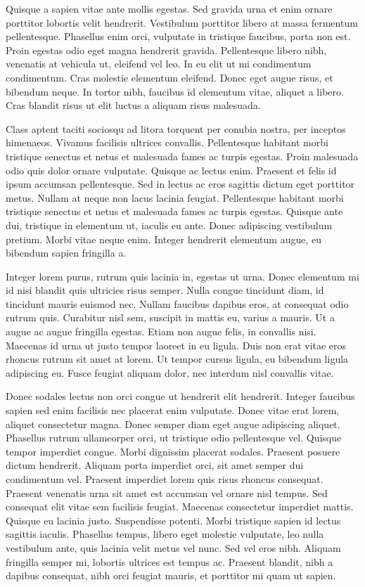 \documentclass{EPUProjetDi}
\begin{document}
Quisque a sapien vitae ante mollis egestas. Sed gravida urna et enim ornare porttitor lobortis velit hendrerit. Vestibulum porttitor libero at massa fermentum pellentesque. Phasellus enim orci, vulputate in tristique faucibus, porta non est. Proin egestas odio eget magna hendrerit gravida. Pellentesque libero nibh, venenatis at vehicula ut, eleifend vel leo. In eu elit ut mi condimentum condimentum. Cras molestie elementum eleifend. Donec eget augue risus, et bibendum neque. In tortor nibh, faucibus id elementum vitae, aliquet a libero. Cras blandit risus ut elit luctus a aliquam risus malesuada.

Class aptent taciti sociosqu ad litora torquent per conubia nostra, per inceptos himenaeos. Vivamus facilisis ultrices convallis. Pellentesque habitant morbi tristique senectus et netus et malesuada fames ac turpis egestas. Proin malesuada odio quis dolor ornare vulputate. Quisque ac lectus enim. Praesent et felis id ipsum accumsan pellentesque. Sed in lectus ac eros sagittis dictum eget porttitor metus. Nullam at neque non lacus lacinia feugiat. Pellentesque habitant morbi tristique senectus et netus et malesuada fames ac turpis egestas. Quisque ante dui, tristique in elementum ut, iaculis eu ante. Donec adipiscing vestibulum pretium. Morbi vitae neque enim. Integer hendrerit elementum augue, eu bibendum sapien fringilla a.

Integer lorem purus, rutrum quis lacinia in, egestas ut urna. Donec elementum mi id nisi blandit quis ultricies risus semper. Nulla congue tincidunt diam, id tincidunt mauris euismod nec. Nullam faucibus dapibus eros, at consequat odio rutrum quis. Curabitur nisl sem, suscipit in mattis eu, varius a mauris. Ut a augue ac augue fringilla egestas. Etiam non augue felis, in convallis nisi. Maecenas id urna ut justo tempor laoreet in eu ligula. Duis non erat vitae eros rhoncus rutrum sit amet at lorem. Ut tempor cursus ligula, eu bibendum ligula adipiscing eu. Fusce feugiat aliquam dolor, nec interdum nisl convallis vitae.

Donec sodales lectus non orci congue ut hendrerit elit hendrerit. Integer faucibus sapien sed enim facilisis nec placerat enim vulputate. Donec vitae erat lorem, aliquet consectetur magna. Donec semper diam eget augue adipiscing aliquet. Phasellus rutrum ullamcorper orci, ut tristique odio pellentesque vel. Quisque tempor imperdiet congue. Morbi dignissim placerat sodales. Praesent posuere dictum hendrerit. Aliquam porta imperdiet orci, sit amet semper dui condimentum vel. Praesent imperdiet lorem quis risus rhoncus consequat. Praesent venenatis urna sit amet est accumsan vel ornare nisl tempus. Sed consequat elit vitae sem facilisis feugiat. Maecenas consectetur imperdiet mattis. Quisque eu lacinia justo. Suspendisse potenti. Morbi tristique sapien id lectus sagittis iaculis. Phasellus tempus, libero eget molestie vulputate, leo nulla vestibulum ante, quis lacinia velit metus vel nunc. Sed vel eros nibh. Aliquam fringilla semper mi, lobortis ultrices est tempus ac. Praesent blandit, nibh a dapibus consequat, nibh orci feugiat mauris, et porttitor mi quam ut sapien.
\end{document}
